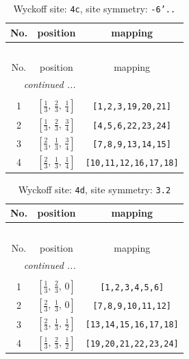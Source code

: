 \documentclass[fleqn,8pt]{jsarticle}
\begin{document}
\renewcommand{\arraystretch}{1.2}
\begin{longtable}{ccc}
\caption{Wyckoff site: {\tt 4c}, site symmetry: {\tt -6'..}}
 \\
 \hline \hline
No. & position & mapping \\ \hline \endfirsthead

\multicolumn{2}{l}{\tablename\ \thetable{}} \\
 \hline \hline
No. & position & mapping \\ \hline \endhead

 \hline \hline
\multicolumn{2}{r}{\footnotesize\it continued ...} \\ \endfoot

 \hline \hline
\multicolumn{2}{r}{} \\ \endlastfoot

1 & $\left[ \frac{1}{3},\, \frac{2}{3},\, \frac{1}{4} \right]$ & {\tt [1,2,3,19,20,21]} \\ \hline
2 & $\left[ \frac{1}{3},\, \frac{2}{3},\, \frac{3}{4} \right]$ & {\tt [4,5,6,22,23,24]} \\ \hline
3 & $\left[ \frac{2}{3},\, \frac{1}{3},\, \frac{3}{4} \right]$ & {\tt [7,8,9,13,14,15]} \\ \hline
4 & $\left[ \frac{2}{3},\, \frac{1}{3},\, \frac{1}{4} \right]$ & {\tt [10,11,12,16,17,18]} \\
\end{longtable}
\renewcommand{\arraystretch}{1.2}
\begin{longtable}{ccc}
\caption{Wyckoff site: {\tt 4d}, site symmetry: {\tt 3.2}}
 \\
 \hline \hline
No. & position & mapping \\ \hline \endfirsthead

\multicolumn{2}{l}{\tablename\ \thetable{}} \\
 \hline \hline
No. & position & mapping \\ \hline \endhead

 \hline \hline
\multicolumn{2}{r}{\footnotesize\it continued ...} \\ \endfoot

 \hline \hline
\multicolumn{2}{r}{} \\ \endlastfoot

1 & $\left[ \frac{1}{3},\, \frac{2}{3},\, 0 \right]$ & {\tt [1,2,3,4,5,6]} \\ \hline
2 & $\left[ \frac{2}{3},\, \frac{1}{3},\, 0 \right]$ & {\tt [7,8,9,10,11,12]} \\ \hline
3 & $\left[ \frac{2}{3},\, \frac{1}{3},\, \frac{1}{2} \right]$ & {\tt [13,14,15,16,17,18]} \\ \hline
4 & $\left[ \frac{1}{3},\, \frac{2}{3},\, \frac{1}{2} \right]$ & {\tt [19,20,21,22,23,24]} \\
\end{longtable}
\end{document}
